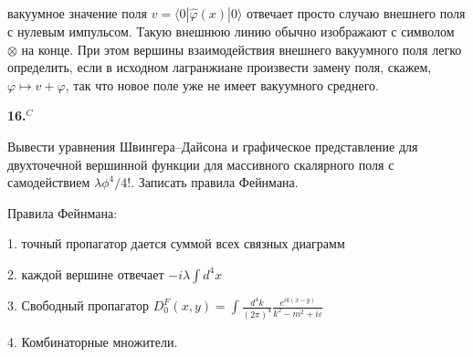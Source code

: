 \documentclass[a4paper,12pt]{article} %
\begin{document}
\begin{ttask}
вакуумное значение поля $v=\langle 0|\hat{\varphi}(x)| 0\rangle$ отвечает просто случаю внешнего поля с нулевым импульсом. Такую внешнюю линию обычно изображают с символом $\otimes$ на конце. При этом вершины взаимодействия внешнего вакуумного поля легко определить, если в исходном лагранжиане произвести замену поля, скажем, $\varphi \mapsto v+\varphi$, так что новое поле уже не имеет вакуумного среднего.




























\end{ttask}



\begin{ttask}\textbf{16.}$^{C}$ 

Вывести уравнения Швингера–Дайсона и графическое представление для двухточечной вершинной функции для массивного скалярного поля с самодействием $\lambda \phi^{4} / 4 ! .$ 
Записать правила Фейнмана.





Правила Фейнмана:


1. точный пропагатор дается суммой всех связных диаграмм 


2. каждой вершине отвечает $ -i \lambda \int d^4 x $


3. Свободный пропагатор
$ D_0^F(x,y)=\int \frac{d^4k}{(2\pi)^4} \frac{e^{ik (x-y)}}{k^2-m^2+i\varepsilon} $


4. Комбинаторные множители.













\end{ttask}
\end{document}
